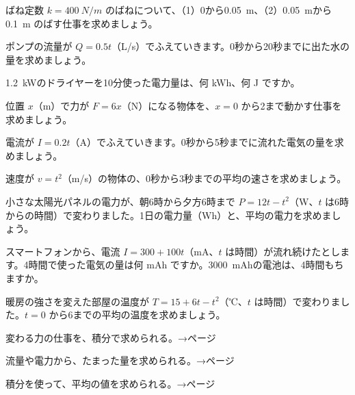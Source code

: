 \bkproblem ばね定数 $k=\qty{400}{N/m}$ のばねについて、（1）0から\qty{0.05}{m}、（2）\qty{0.05}{m}から\qty{0.1}{m} のばす仕事を求めましょう。

\bkproblem ポンプの流量が $Q=0.5t$（L/s）でふえていきます。0秒から20秒までに出た水の量を求めましょう。

\bkproblem \qty{1.2}{kW}のドライヤーを10分使った電力量は、何 kWh、何 J ですか。

\bkproblem 位置 $x$（m）で力が $F=6x$（N）になる物体を、$x=0$ から2まで動かす仕事を求めましょう。

\bkproblem 電流が $I=0.2t$（A）でふえていきます。0秒から5秒までに流れた電気の量を求めましょう。


\bkproblem 速度が $v=t^2$（m/s）の物体の、0秒から3秒までの平均の速さを求めましょう。

\bkproblem 小さな太陽光パネルの電力が、朝6時から夕方6時まで $P=12t-t^2$（W、$t$ は6時からの時間）で変わりました。1日の電力量（Wh）と、平均の電力を求めましょう。

\bkproblem スマートフォンから、電流 $I=300+100t$（mA、$t$ は時間）が流れ続けたとします。4時間で使った電気の量は何 mAh ですか。\qty{3000}{mAh}の電池は、4時間もちますか。

\bkproblem 暖房の強さを変えた部屋の温度が $T=15+6t-t^2$（℃、$t$ は時間）で変わりました。$t=0$ から6までの平均の温度を求めましょう。

\begin{furikaeri}
\begin{checklist}
\item 変わる力の仕事を、積分で求められる。\hfill{\footnotesize\sffamily\color{bkTheme}→\pageref{bk:5-12:sekibun}ページ}
\item 流量や電力から、たまった量を求められる。\hfill{\footnotesize\sffamily\color{bkTheme}→\pageref{bk:5-12:ryuuryou}ページ}
\item 積分を使って、平均の値を求められる。\hfill{\footnotesize\sffamily\color{bkTheme}→\pageref{bk:5-12:heikin}ページ}
\end{checklist}
\end{furikaeri}


